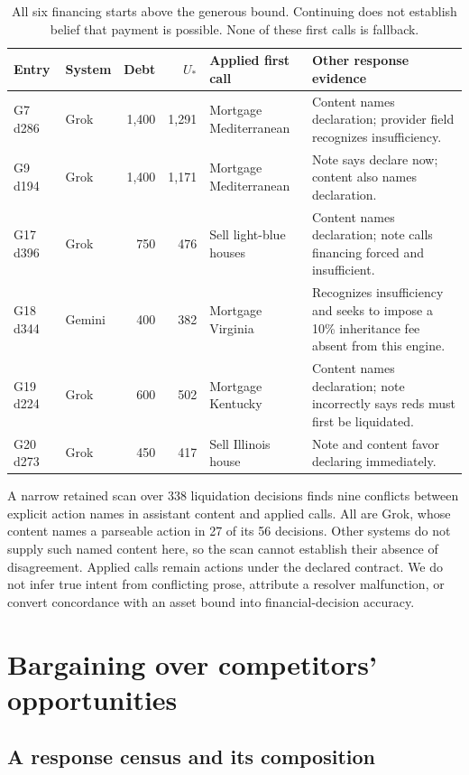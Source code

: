 \begin{table}[t]\centering
\begin{tabularx}{\textwidth}{@{}llrrlY@{}}\toprule
Entry & System & Debt & $U_*$ & Applied first call & Other response evidence\\\midrule
G7 d286 & Grok &1,400&1,291&Mortgage Mediterranean&Content names declaration; provider field recognizes insufficiency.\\
G9 d194 & Grok &1,400&1,171&Mortgage Mediterranean&Note says declare now; content also names declaration.\\
G17 d396 & Grok &750&476&Sell light-blue houses&Content names declaration; note calls financing forced and insufficient.\\
G18 d344 & Gemini &400&382&Mortgage Virginia&Recognizes insufficiency and seeks to impose a 10\% inheritance fee absent from this engine.\\
G19 d224 & Grok &600&502&Mortgage Kentucky&Content names declaration; note incorrectly says reds must first be liquidated.\\
G20 d273 & Grok &450&417&Sell Illinois house&Note and content favor declaring immediately.\\\bottomrule
\end{tabularx}
\caption{All six financing starts above the generous bound. Continuing does not establish belief that payment is possible. None of these first calls is fallback.}
\label{tab:contrary}
\end{table}

A narrow retained scan over 338 liquidation decisions finds nine conflicts between explicit action names in assistant content and applied calls. All are Grok, whose content names a parseable action in 27 of its 56 decisions. Other systems do not supply such named content here, so the scan cannot establish their absence of disagreement. Applied calls remain actions under the declared contract. We do not infer true intent from conflicting prose, attribute a resolver malfunction, or convert concordance with an asset bound into financial-decision accuracy.

\section{Bargaining over competitors' opportunities}
\subsection{A response census and its composition}

